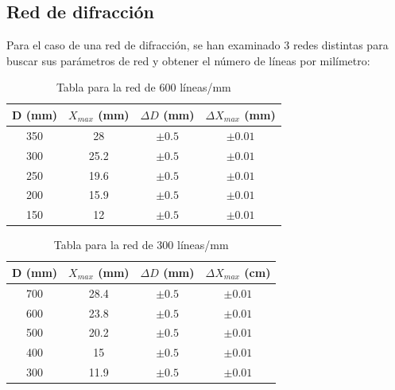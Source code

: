 \documentclass[11pt, a4paper, twocolumn]{article}
\begin{document}
\subsection{Red de difracción}
Para el caso de una red de difracción, se han examinado 3 redes distintas para buscar sus parámetros de red y obtener el número de líneas por milímetro:

\begin{table}[H]
    \caption{Tabla para la red de 600 líneas/mm }
    \centering
    \small
    \setlength{\tabcolsep}{4pt}
    \begin{tabular}{cccc}
        \hline
        D (mm) &   $X_{max}$ (mm) & $\Delta D$ (mm)   & $\Delta X_{max}$ (mm)   \\
        \hline
            350 &           28   & $\pm 0.5$         & $\pm 0.01$              \\
            300 &           25.2 & $\pm 0.5$         & $\pm 0.01$              \\
            250 &           19.6 & $\pm 0.5$         & $\pm 0.01$              \\
            200 &           15.9 & $\pm 0.5$         & $\pm 0.01$              \\
            150 &           12   & $\pm 0.5$         & $\pm 0.01$              \\
        \hline
    \end{tabular}    
\end{table}

\vspace{0.5cm}

\begin{table}[H]
    \caption{Tabla para la red de 300 líneas/mm}
    \centering
    \small
    \setlength{\tabcolsep}{4pt}

    \begin{tabular}{cccc}
        \hline
        D (mm) &   $X_{max}$ (mm) & $\Delta D$ (mm)   & $\Delta X_{max}$ (cm)   \\
        \hline
            700 &           28.4 & $\pm 0.5$         & $\pm 0.01$              \\
            600 &           23.8 & $\pm 0.5$         & $\pm 0.01$              \\
            500 &           20.2 & $\pm 0.5$         & $\pm 0.01$              \\
            400 &           15   & $\pm 0.5$         & $\pm 0.01$              \\
            300 &           11.9 & $\pm 0.5$         & $\pm 0.01$              \\
        \hline
    \end{tabular}

\end{table}
\end{document}
